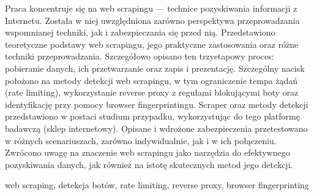 \streszczenie
Praca koncentruje się na web scrapingu --- technice pozyskiwania informacji z Internetu.
Została w niej uwzględniona zarówno perspektywa przeprowadzania wspomnianej techniki, jak i zabezpieczania się przed nią.
Przedstawiono teoretyczne podstawy web scrapingu, jego praktyczne zastosowania oraz różne techniki przeprowadzania.
Szczegółowo opisano ten trzyetapowy proces: pobieranie danych, ich przetwarzanie oraz zapis i prezentację.
Szczególny nacisk położono na metody detekcji web scrapingu, w tym ograniczenie tempa żądań (rate limiting),
wykorzystanie reverse proxy z regułami blokującymi boty oraz identyfikację przy pomocy browser fingerprintingu.
Scraper oraz metody detekcji przedstawiono w postaci studium przypadku, wykorzystując do tego platformę badawczą (sklep internetowy).
Opisane i wdrożone zabezpieczenia przetestowano w różnych scenariuszach, zarówno indywidualnie, jak i w ich połączeniu.
Zwrócono uwagę na znaczenie web scrapingu jako narzędzia do efektywnego pozyskiwania danych, jak również na istotę skutecznych metod jego detekcji.

\slowakluczowe web scraping, detekcja botów, rate limiting, reverse proxy, browser fingerprinting